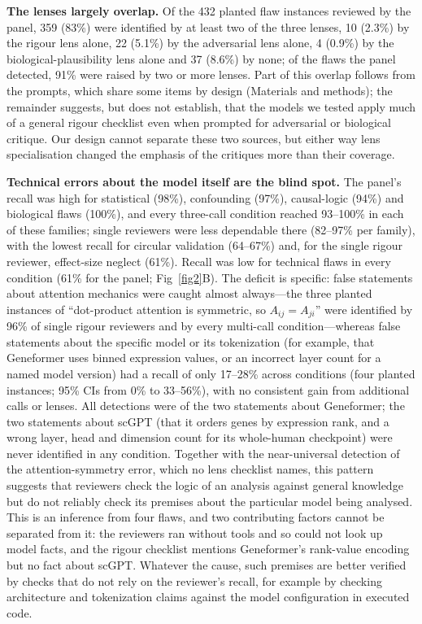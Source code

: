 \textbf{The lenses largely overlap.} Of the 432 planted flaw instances reviewed by the panel, 359 (83\%) were identified by at least two of the three lenses, 10 (2.3\%) by the rigour lens alone, 22 (5.1\%) by the adversarial lens alone, 4 (0.9\%) by the biological-plausibility lens alone and 37 (8.6\%) by none; of the flaws the panel detected, 91\% were raised by two or more lenses. Part of this overlap follows from the prompts, which share some items by design (Materials and methods); the remainder suggests, but does not establish, that the models we tested apply much of a general rigour checklist even when prompted for adversarial or biological critique. Our design cannot separate these two sources, but either way lens specialisation changed the emphasis of the critiques more than their coverage.

\textbf{Technical errors about the model itself are the blind spot.} The panel's recall was high for statistical (98\%), confounding (97\%), causal-logic (94\%) and biological flaws (100\%), and every three-call condition reached 93--100\% in each of these families; single reviewers were less dependable there (82--97\% per family), with the lowest recall for circular validation (64--67\%) and, for the single rigour reviewer, effect-size neglect (61\%). Recall was low for technical flaws in every condition (61\% for the panel; Fig~\ref{fig2}B). The deficit is specific: false statements about attention mechanics were caught almost always---the three planted instances of ``dot-product attention is symmetric, so $A_{ij}=A_{ji}$'' were identified by 96\% of single rigour reviewers and by every multi-call condition---whereas false statements about the specific model or its tokenization (for example, that Geneformer uses binned expression values, or an incorrect layer count for a named model version) had a recall of only 17--28\% across conditions (four planted instances; 95\% CIs from 0\% to 33--56\%), with no consistent gain from additional calls or lenses. All detections were of the two statements about Geneformer; the two statements about scGPT (that it orders genes by expression rank, and a wrong layer, head and dimension count for its whole-human checkpoint) were never identified in any condition. Together with the near-universal detection of the attention-symmetry error, which no lens checklist names, this pattern suggests that reviewers check the logic of an analysis against general knowledge but do not reliably check its premises about the particular model being analysed. This is an inference from four flaws, and two contributing factors cannot be separated from it: the reviewers ran without tools and so could not look up model facts, and the rigour checklist mentions Geneformer's rank-value encoding but no fact about scGPT. Whatever the cause, such premises are better verified by checks that do not rely on the reviewer's recall, for example by checking architecture and tokenization claims against the model configuration in executed code.


